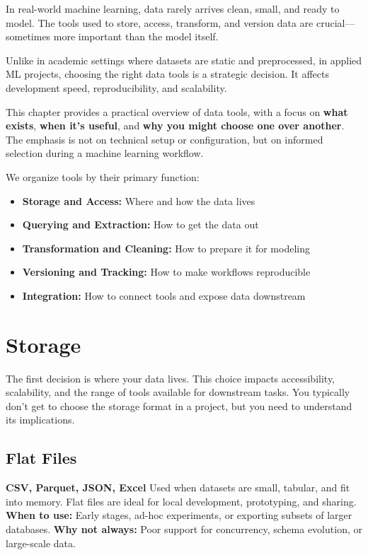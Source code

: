 \documentclass[12pt,openany, draft]{book}
\begin{document}
In real-world machine learning, data rarely arrives clean, small, and ready to model. The tools used to store, access, transform, and version data are crucial—sometimes more important than the model itself.

Unlike in academic settings where datasets are static and preprocessed, in applied ML projects, choosing the right data tools is a strategic decision. It affects development speed, reproducibility, and scalability. \newline

This chapter provides a practical overview of data tools, with a focus on \textbf{what exists}, \textbf{when it’s useful}, and \textbf{why you might choose one over another}. The emphasis is not on technical setup or configuration, but on informed selection during a machine learning workflow. \newline

We organize tools by their primary function:
\begin{itemize}
    \item \textbf{Storage and Access:} Where and how the data lives
    \item \textbf{Querying and Extraction:} How to get the data out
    \item \textbf{Transformation and Cleaning:} How to prepare it for modeling
    \item \textbf{Versioning and Tracking:} How to make workflows reproducible
    \item \textbf{Integration:} How to connect tools and expose data downstream
\end{itemize}



\section{Storage}

The first decision is where your data lives. This choice impacts accessibility, scalability, and the range of tools available for downstream tasks. You typically don’t get to choose the storage format in a project, but you need to understand its implications.

\subsection*{Flat Files}

\textbf{CSV, Parquet, JSON, Excel} \newline
Used when datasets are small, tabular, and fit into memory. Flat files are ideal for local development, prototyping, and sharing. \newline
\textbf{When to use:} Early stages, ad-hoc experiments, or exporting subsets of larger databases. \newline
\textbf{Why not always:} Poor support for concurrency, schema evolution, or large-scale data.
\end{document}

